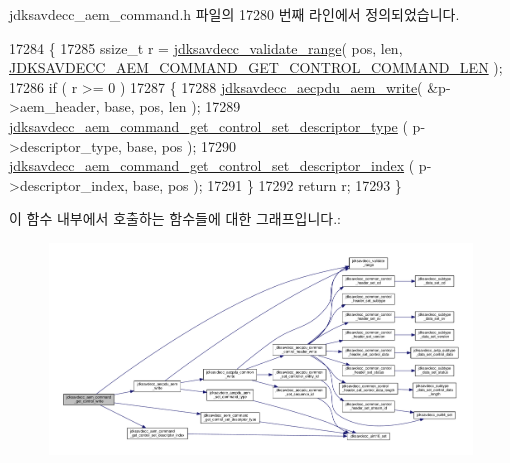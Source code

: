 jdksavdecc\+\_\+aem\+\_\+command.\+h 파일의 17280 번째 라인에서 정의되었습니다.


\begin{DoxyCode}
17284 \{
17285     ssize\_t r = \hyperlink{group__util_ga9c02bdfe76c69163647c3196db7a73a1}{jdksavdecc\_validate\_range}( pos, len, 
      \hyperlink{group__command__get__control_ga1c638c26d2d71578b725bf24ae975d98}{JDKSAVDECC\_AEM\_COMMAND\_GET\_CONTROL\_COMMAND\_LEN} );
17286     \textcolor{keywordflow}{if} ( r >= 0 )
17287     \{
17288         \hyperlink{group__aecpdu__aem_gad658e55771cce77cecf7aae91e1dcbc5}{jdksavdecc\_aecpdu\_aem\_write}( &p->aem\_header, base, pos, len );
17289         \hyperlink{group__command__get__control_ga5b685187fafd639322cdee542dcd80d2}{jdksavdecc\_aem\_command\_get\_control\_set\_descriptor\_type}
      ( p->descriptor\_type, base, pos );
17290         \hyperlink{group__command__get__control_ga0782470ec152cdffee65c219ec629c03}{jdksavdecc\_aem\_command\_get\_control\_set\_descriptor\_index}
      ( p->descriptor\_index, base, pos );
17291     \}
17292     \textcolor{keywordflow}{return} r;
17293 \}
\end{DoxyCode}


이 함수 내부에서 호출하는 함수들에 대한 그래프입니다.\+:
\nopagebreak
\begin{figure}[H]
\begin{center}
\leavevmode
\includegraphics[width=350pt]{group__command__get__control_ga5141e3d532e078989ac6d66373910cdd_cgraph}
\end{center}
\end{figure}


